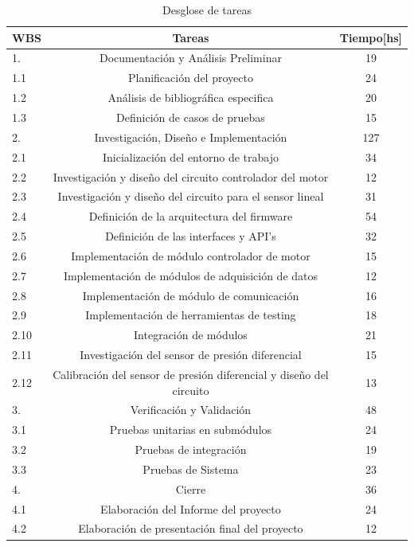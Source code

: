 \begin{table}[h]
	\centering
	\caption[Desglose de tareas]{Desglose de tareas}
	\begin{tabular}{l c c}    
		\toprule
		\textbf{WBS}  & \textbf{Tareas} 	 & \textbf{Tiempo[hs]}\\
		\midrule
		1.   & Documentación y Análisis Preliminar	&  19 \\		
		1.1  & Planificación del proyecto			&  24 \\
		1.2  & Análisis de bibliográfica especifica &  20 \\
		1.3  & Definición de casos de pruebas		&  15 \\
		2.   & Investigación, Diseño e Implementación & 127 \\
		2.1  & Inicialización del entorno de trabajo  & 34\\
		2.2  & Investigación y diseño del circuito controlador del motor & 12\\
		2.3 & Investigación y diseño del circuito para el sensor lineal &31\\
		2.4 & Definición de la arquitectura del firmware & 54\\
		2.5 & Definición de las interfaces y API’s  &32\\
		2.6 & Implementación de módulo controlador de motor &15\\
		2.7 & Implementación de módulos de adquisición de datos &12\\
		2.8 & Implementación de módulo de comunicación & 16\\
		2.9 & Implementación de herramientas de testing & 18\\
		2.10 & Integración de módulos & 21\\
		2.11 & Investigación  del sensor de presión diferencial & 15\\
		2.12 & Calibración del sensor de presión diferencial y diseño del circuito &13\\
		3. & Verificación y Validación & 48\\
		3.1 & Pruebas unitarias en submódulos &24\\
		3.2 & Pruebas de integración &19\\
		3.3 & Pruebas de Sistema &23\\
		4. & Cierre & 36\\
		4.1 & Elaboración del Informe del proyecto & 24\\
		4.2 & Elaboración de presentación final del proyecto &12\\
		\bottomrule
		\hline
	\end{tabular}
	\label{tab:seccplanificacion}
\end{table}

